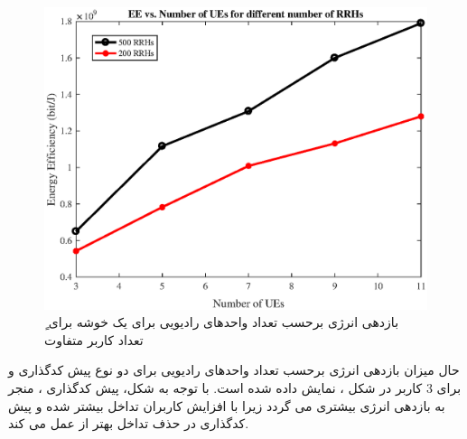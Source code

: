 \begin{figure}[H]
  \centering
    \includegraphics[width=\linewidth]{./fig/eeUE}
  \caption{ٍ بازدهی انرژی برحسب تعداد واحدهای رادیویی برای یک خوشه برای تعداد کاربر متفاوت}
  \label{fig:eeUE}
  \end{figure}
  حال میزان بازدهی انرژی برحسب تعداد واحدهای رادیویی برای دو نوع پیش کدگذاری  و   برای 3 کاربر در شکل ، نمایش داده شده است.
  با توجه به شکل، پیش کدگذاری ، منجر به بازدهی انرژی بیشتری می گردد زیرا با افزایش کاربران تداخل بیشتر شده و پیش کدگذاری  در حذف تداخل بهتر از  عمل می کند.
  
